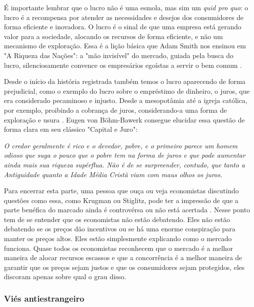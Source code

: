 É importante lembrar que o lucro não é uma esmola, mas sim um \textit{quid pro quo}: o lucro é a recompensa por atender as necessidades e desejos dos consumidores de forma eficiente e inovadora. O lucro é o sinal de que uma empresa está gerando valor para a sociedade, alocando os recursos de forma eficiente, e não um mecanismo de exploração. Essa é a lição básica que Adam Smith nos ensinou em "A Riqueza das Nações": a "mão invisível" do mercado, guiada pela busca do lucro, silenciosamente convence os empresários egoístas a servir o bem comum \cite{smith1776inquiry}.

Desde o início da história registrada também temos o lucro aparecendo de forma prejudicial, como o exemplo do lucro sobre o empréstimo de dinheiro, o juros, que era considerado pecaminoso e injusto. Desde a mesopotâmia até a igreja católica, por exemplo, proibindo a cobrança de juros, considerando-a uma forma de exploração e usura \cite{tomasdeaquino_summa_78}. Eugen von Böhm-Bawerk consegue elucidar essa questão de forma clara em seu clássico "Capital e Juro":

\begin{citacao}
    \textit{O credor geralmente é rico e o devedor, pobre, e o primeiro parece um homem odioso que suga o pouco que o pobre tem na forma de juros e que pode aumentar ainda mais sua riqueza supérflua. Não é de se surpreender, contudo, que tanto a Antiguidade quanto a Idade Média Cristã viam com maus olhos os juros. 
    } \newline \cite{von2022capital}
\end{citacao}

Para encerrar esta parte, uma pessoa que ouça ou veja economistas discutindo questões como essa, como Krugman ou Stiglitz, pode ter a impressão de que a parte benéfica do marcado ainda é controvérsa ou não está acertada \cite{krugman2003great,stiglitz2003roaring,The_Myth_of_the_Rational_Voter}. Nesse ponto tem de se entender que os economistas não estão debatendo. Eles não estão debatendo se os preços dão incentivos ou se há uma enorme conspiração para manter os preços altos. Eles estão simplesmente explicando como o mercado funciona. Quase todos os economistas reconhecem que o mercado é a melhor maneira de alocar recursos escassos e que a concorrência é a melhor maneira de garantir que os preços sejam justos e que os consumidores sejam protegidos, eles discoram apenas sobre qual o grau disso.

\subsubsection{Viés antiestrangeiro}


